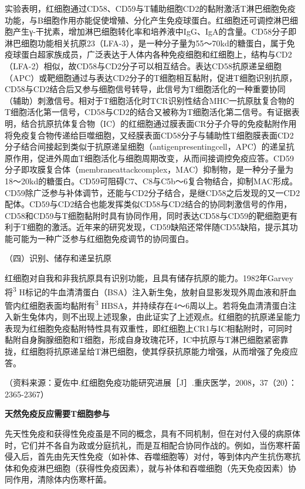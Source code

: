 实验表明，红细胞通过CD58、CD59与T辅助细胞CD2的黏附激活T淋巴细胞免疫功能，与B细胞作用亦能促使增殖、分化产生免疫球蛋白。红细胞还可调控淋巴细胞产生γ-干扰素，增加淋巴细胞转化率和培养液中IgG、IgA的含量。CD58分子即淋巴细胞功能相关抗原23（LFA-3），是一种分子量为55～70kd的糖蛋白，属于免疫球蛋白超家族成员，广泛表达于人体内各种免疫细胞和红细胞上，结构与CD2（LFA-2）相似，故CD58与CD2分子可以相互结合。表达CD58抗原递呈细胞（APC）或靶细胞通过与表达CD2分子的T细胞相互黏附，促进T细胞识别抗原，CD58与CD2结合后又参与细胞信号转导，此信号为T细胞活化的一种重要协同（辅助）刺激信号。相对于T细胞活化时TCR识别性结合MHC一抗原肽复合物的T细胞活化第一信号，CD58与CD2的结合又被称为T细胞活化第二信号。有证据表明，结合抗原抗体复合物（IC）的红细胞通过膜表面CR分子介导的免疫黏附作用将免疫复合物传递给巨噬细胞，又经膜表面CD58分子与辅助性T细胞膜表面CD2分子结合间接起到类似于抗原递呈细胞（antigenpresentingcell，APC）的递呈抗原作用，促进外周血T细胞活化与细胞周期改变，从而间接调控免疫应答。CD59分子即攻膜复合体（membraneattackcomplex，MAC）抑制物，是一种分子量为18～20kd的糖蛋白。CD59可阻碍C7、C8与C5b～6复合物结合，抑制MAC形成。CD59除广泛参与补体调节，还能与CD2分子结合，是继CD58之后发现的又一CD2配体。CD59与CD2结合也能发挥类似CD58与CD2结合的协同刺激信号的作用，CD58和CD59与T细胞黏附时具有协同作用，同时表达CD58与CD59的靶细胞更有利于T细胞的激活。近年来的研究发现，CD59缺陷还常伴随CD55缺陷，提示其功能可能为一种广泛参与红细胞免疫调节的协同蛋白。

（四）识别、储存和递呈抗原

红细胞对自我和非我抗原具有识别功能，且具有储存抗原的能力。1982年Garvey将\textsuperscript{3}
H标记的牛血清清蛋白（BSA）注入新生兔，放射自显影发现外周血液和肝血管内红细胞表面均黏附有\textsuperscript{3}
HBSA，并持续存在4～6周以上。若将兔血清清蛋白注入新生兔体内，则不出现上述现象，由此证实了上述观点。红细胞的抗原递呈能力表现为红细胞免疫黏附特性具有双重性，即红细胞上CR1与IC相黏附时，可同时黏附自身胸腺细胞和T细胞，形成自身玫瑰花环，IC中抗原与T淋巴细胞紧密靠拢，红细胞将抗原递呈给T淋巴细胞，使其俘获抗原能力增强，从而增强了免疫应答。

（资料来源：夏佐中.红细胞免疫功能研究进展［J］.重庆医学，2008，37（20）：2365-2367）

\begin{center}
\textbf{\Large 天然免疫反应需要T细胞参与}
\end{center}

先天性免疫和获得性免疫虽是不同的概念，具有不同机制，但在对付入侵的病原体时，它们并不各自为政或分庭抗礼，而是互相配合协同作战的。例如，当伤寒杆菌侵入后，首先由先天性免疫（如补体、吞噬细胞等）对付，等到体内产生抗伤寒抗体和免疫淋巴细胞（获得性免疫因素），就与补体和吞噬细胞（先天免疫因素）协同作用，清除体内伤寒杆菌。


